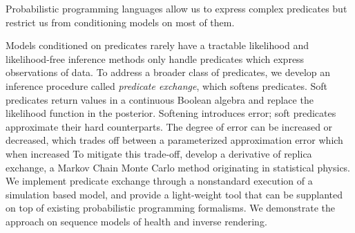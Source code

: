 Probabilistic programming languages allow us to express complex predicates but restrict us from conditioning models on most of them.

Models conditioned on predicates rarely have a tractable likelihood and likelihood-free inference methods
only handle predicates which express observations of data.
To address a broader class of predicates, we develop an inference procedure called \emph{predicate exchange}, which softens predicates.
Soft predicates return values in a continuous Boolean algebra and replace the likelihood function in the posterior.
Softening introduces error; soft predicates approximate their hard counterparts.
The degree of error can be increased or decreased, which trades off between  a parameterized approximation error which when increased
To mitigate this trade-off, develop a derivative of replica exchange, a Markov Chain Monte Carlo method originating in statistical physics.
We implement predicate exchange through a nonstandard execution of a simulation based model, and provide a light-weight tool that can be supplanted on top of existing probabilistic programming formalisms. 
We demonstrate the approach on sequence models of health and inverse rendering. 



% 